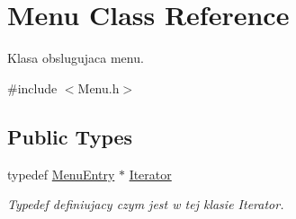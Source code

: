 \hypertarget{class_menu}{}\section{Menu Class Reference}
\label{class_menu}


Klasa obslugujaca menu.  




{\ttfamily \#include $<$Menu.\+h$>$}

\subsection*{Public Types}
\begin{DoxyCompactItemize}
\item 
\hypertarget{class_menu_aceaa934be18280340c221593bbee54d6}{}typedef \hyperlink{class_menu_entry}{Menu\+Entry} $\ast$ \hyperlink{class_menu_aceaa934be18280340c221593bbee54d6}{Iterator}\label{class_menu_aceaa934be18280340c221593bbee54d6}

\begin{DoxyCompactList}\small\item\em Typedef definiujacy czym jest w tej klasie Iterator. \end{DoxyCompactList}\end{DoxyCompactItemize}

